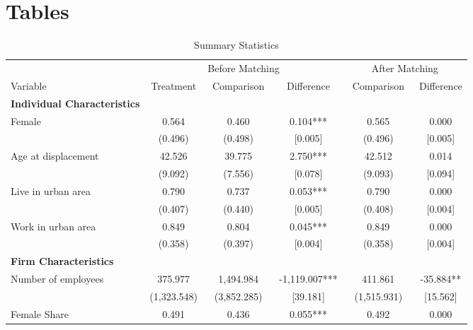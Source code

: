\documentclass[12pt]{article}
\renewcommand{\arraystretch}{1.0} %
\begin{document}
\newpage

{}




\newpage

\section*{Tables}

\begin{table}[htbp]
\renewcommand{\arraystretch}{0.85}
\setlength{\tabcolsep}{0.1mm}{}
  \centering
  \caption{Summary Statistics}
{\small
    \begin{tabular}{lccccc}
\toprule
          & \multicolumn{3}{c}{Before Matching} & \multicolumn{2}{c}{After Matching} \\
          \cmidrule(r){2-4} \cmidrule(l){5-6}
    Variable & Treatment & ~Comparison~ & Difference & ~Comparison~ & Difference \\
          \midrule \midrule
    \textbf{Individual Characteristics} &       &       &       &       &  \\
    Female & 0.564 & 0.460 & 0.104*** & 0.565 & 0.000 \\
          & (0.496) & (0.498) & [0.005] & (0.496) & [0.005] \\
    Age at displacement   & 42.526 & 39.775 & 2.750*** & 42.512 & 0.014 \\
          & (9.092) & (7.556) & [0.078] & (9.093) & [0.094] \\
    Live in urban area & 0.790 & 0.737 & 0.053*** & 0.790 & 0.000 \\
          & (0.407) & (0.440) & [0.005] & (0.408) & [0.004] \\
    Work in urban area & 0.849 & 0.804 & 0.045*** & 0.849 & 0.000 \\
          & (0.358) & (0.397) & [0.004] & (0.358) & [0.004] \\
          \midrule
    \textbf{Firm Characteristics} &       &       &       &       &  \\
    Number of employees & 375.977 & 1,494.984 & -1,119.007*** & 411.861 & -35.884** \\
          & (1,323.548) & (3,852.285) & [39.181] & (1,515.931) & [15.562] \\
    Female Share & 0.491 & 0.436 & 0.055*** & 0.492 & 0.000 \\

\end{tabular}}
\end{table}
\end{document}
